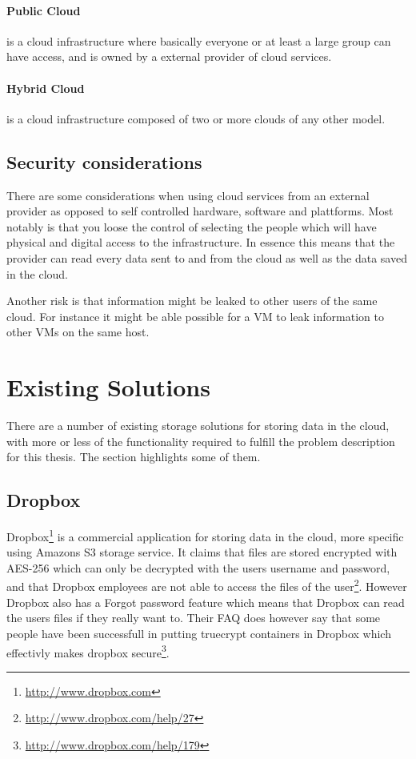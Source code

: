 \documentclass[english,12pt,a4paper]{book}
\begin{document}
\paragraph{Public Cloud} is a cloud infrastructure where basically everyone or
at least a large group can have access, and is owned by a external provider of
cloud services.

\paragraph{Hybrid Cloud} is a cloud infrastructure composed of two or more
clouds of any other model. 

\subsection{Security considerations} 
There are some considerations when using cloud services from an external provider 
as opposed to self controlled hardware, software and plattforms. Most notably
is that you loose the control of selecting the people which will have physical
and digital access to the infrastructure. In essence this means that the
provider can read every data sent to and from the cloud as well as the data
saved in the cloud.

Another risk is that information might be leaked to other users of the same
cloud. For instance it might be able possible for a \ac{VM} to leak information
to other \ac{VM}s on the same host. 

\section{Existing Solutions}
There are a number of existing storage solutions for storing data in the cloud,
with more or less of the functionality required to fulfill the problem
description for this thesis. The section highlights some of them.

\subsection{Dropbox} Dropbox\footnote{\url{http://www.dropbox.com}} is a
commercial application for storing data in the cloud, more specific using
Amazons S3 storage service. It claims that files are stored encrypted with
\ac{AES}-256 which can only be decrypted with the users username and password,
and that Dropbox employees are not able to access the files of the
user\footnote{\url{http://www.dropbox.com/help/27}}. However Dropbox also has a
Forgot password feature which means that Dropbox can read the users files if
they really want to. Their \ac{FAQ} does however say that some people have been
successfull in putting truecrypt containers in Dropbox which effectivly makes
dropbox secure\footnote{\url{http://www.dropbox.com/help/179}}.
\end{document}
